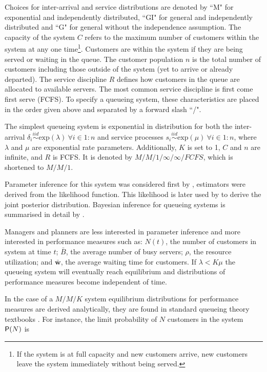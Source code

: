 \documentclass[article]{jss}
\begin{document}
Choices for inter-arrival and service distributions are denoted by ``M" for exponential and independently distributed, ``GI" for general and independently distributed and ``G" for general without the independence assumption. The capacity of the system $C$ refers to the maximum number of customers within the system at any one time\footnote{If the system is at full capacity and new customers arrive, new customers leave the system immediately without being served.}. Customers are within the system if they are being served or waiting in the queue. The customer population $n$ is the total number of customers including those outside of the system (yet to arrive or already departed). The service discipline $R$ defines how customers in the queue are allocated to available servers. The most common service discipline is first come first serve (FCFS). To specify a queueing system, these characteristics are placed in the order given above and separated by a forward slash ``/". 

The simplest queueing system is exponential in distribution for both the inter-arrival $\delta_i \overset{iid}{\sim} \mathrm{exp}(\lambda) ~ \forall i \in 1:n$ and service processes $s_i \overset{iid}{\sim} \mathrm{exp}(\mu) ~ \forall i \in 1:n$, where $\lambda$ and $\mu$ are exponential rate parameters. Additionally, $K$ is set to 1, $C$ and $n$ are infinite, and $R$ is FCFS. It is denoted by $M/M/1/ \infty / \infty / FCFS$, which is shortened to $M/M/1$. 

Parameter inference for this system was considered first by \citet{clarke1957maximum}, estimators were derived from the likelihood function. This likelihood is later used by \citet{muddapur1972bayesian} to derive the joint posterior distribution. Bayesian inference for queueing systems is summarised in detail by \citet{insua2012bayesian}. 

Managers and planners are less interested in parameter inference and more interested in performance measures such as: $N(t)$, the number of customers in system at time $t$; $\bar{B}$, the average number of busy servers; $\rho$, the resource utilization; and $\bar{\mathbf{w}}$, the average waiting time for customers. If $\lambda < K \mu$ the queueing system will eventually reach equilibrium and distributions of performance measures become independent of time. 

In the case of a $M/M/K$ system equilibrium distributions for performance measures are derived analytically, they are found in standard queueing theory textbooks \citep{lipsky2008queueing, thomopoulos2012fundamentals}. For instance, the limit probability of $N$ customers in the system $\mathsf{P}(N)$  is
\end{document}
